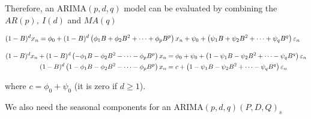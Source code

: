 Therefore, an ARIMA$(p,d,q)$ model can be evaluated by combining the $AR(p),\ I(d)$ and $MA(q)$

\begin{align}
(1-B)^d x_n
&= \phi_0+(1-B)^d\left(\phi_1 B+\phi_2 B^2 +\dots + \phi_p B^p\right)x_n +
\psi_0+\left(\psi_1 B+\psi_2 B^2 +\dots + \psi_q B^q\right)\varepsilon_n \nonumber 
\end{align}

\begin{align}
(1-B)^d x_n + (1-B)^d\left(-\phi_1 B-\phi_2 B^2 -\dots - \phi_p B^p\right)x_n
&= \phi_0 + \psi_0+\left(1-\psi_1 B-\psi_2 B^2 +\dots - \psi_q B^q\right)\varepsilon_n  \nonumber \\
(1-B)^d\left(1-\phi_1 B-\phi_2 B^2 -\dots - \phi_p B^p\right)x_n
&=c+\left(1-\psi_1 B-\psi_2 B^2 +\dots - \psi_q B^q\right)\varepsilon_n  \nonumber \\
\end{align}

where $c= \phi_0 + \psi_0$ (it is zero if $d\geq1$).

We also need the seasonal components for an ARIMA$(p,d,q)(P,D,Q)_s$ 

